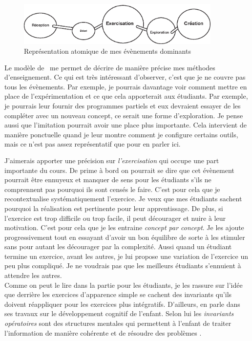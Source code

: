 \begin{figure}[H]
    \begin{center}
        \includegraphics[width=0.9\textwidth]{figures/EAEs.eps}
        \caption{Représentation atomique de mes évènements dominants~\cite{leclercq2008modele}}
    \end{center}
\end{figure}
Le modèle de~\citet{perrenoud1992differenciation} me permet de décrire de manière précise mes méthodes d'enseignement. Ce qui est très intéressant d'observer, c'est que je ne couvre pas tous les évènements. Par exemple, je pourrais davantage voir comment mettre en place de l'expérimentation et ce que cela apporterait aux étudiants. Par exemple, je pourrais leur fournir des programmes partiels et eux devraient essayer de les compléter avec un nouveau concept, ce serait une forme d’exploration. Je pense aussi que l'imitation pourrait avoir une place plus importante. Cela intervient de manière ponctuelle quand je leur montre comment je configure certains outils, mais ce n'est pas assez représentatif que pour en parler ici.

J'aimerais apporter une précision sur \emph{l’exercisation} qui occupe une part importante du cours. De prime à bord on pourrait se dire que cet évènement pourrait être ennuyeux et manquer de sens pour les étudiants s'ils ne comprennent pas pourquoi ils sont censés le faire. C'est pour cela que je recontextualise systématiquement l'exercice. Je veux que mes étudiants sachent pourquoi la réalisation est pertinente pour leur apprentissage. De plus, si l'exercice est trop difficile ou trop facile, il peut décourager et nuire à leur motivation. C'est pour cela que je les entraine \emph{concept par concept}. Je les ajoute progressivement tout en essayant d'avoir un bon équilibre de sorte à les stimuler sans pour autant les décourager par la complexité. Aussi quand un étudiant termine un exercice, avant les autres, je lui propose une variation de l'exercice un peu plus compliqué. Je ne voudrais pas que les meilleurs étudiants s'ennuient à attendre les autres.\\

Comme on peut le lire dans la partie pour les étudiants, je les rassure sur l'idée que derrière les exercices d'apparence simple se cachent des invariants qu'ils doivent réappliquer pour les exercices plus intégratifs. D'ailleurs, \citet{piaget1970structures} en parle dans ses travaux sur le développement cognitif de l'enfant. Selon lui les \emph{invariants opératoires} sont des structures mentales qui permettent à l'enfant de traiter l'information de manière cohérente et de résoudre des problèmes \cite{piaget1970structures}.

